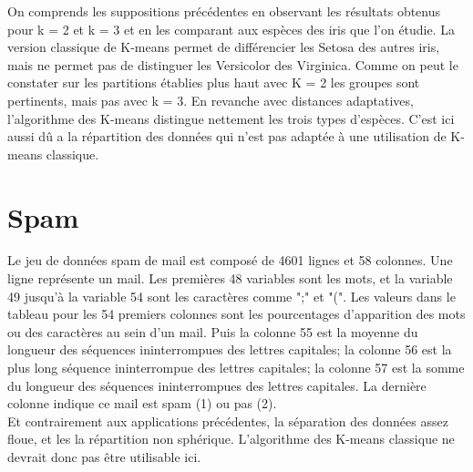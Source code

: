 \documentclass[a4paper, titlepage]{report}
\begin{document}
On comprends les suppositions précédentes en observant les résultats obtenus pour k = 2 et k = 3 et en les comparant aux espèces des iris que l'on étudie. La version classique de K-means permet de différencier les Setosa des autres iris, mais ne permet pas de distinguer les Versicolor des Virginica. Comme on peut le constater sur les partitions établies plus haut avec K = 2 les groupes sont pertinents, mais pas avec k = 3. En revanche avec distances adaptatives, l'algorithme des K-means distingue nettement les trois types d'espèces. C'est ici aussi dû a la répartition des données qui n'est pas adaptée à une utilisation de K-means classique.




\newpage
\section{Spam}
Le jeu de données spam de mail est composé de 4601 lignes et 58 colonnes. Une ligne représente un mail. Les premières 48 variables sont les mots, et la variable 49 jusqu'à la variable 54 sont les caractères comme ";" et "(". Les valeurs dans le tableau pour les 54 premiers colonnes sont les pourcentages d'apparition des mots ou des caractères au sein d'un mail. Puis la colonne 55 est la moyenne du longueur des séquences ininterrompues des lettres capitales; la colonne 56 est la plus long séquence ininterrompue des lettres capitales; la colonne 57 est la somme du longueur des séquences ininterrompues des lettres capitales. La dernière colonne indique ce mail est spam (1) ou pas (2).\\

Et contrairement aux applications précédentes, la séparation des données assez floue, et les la répartition non sphérique. L'algorithme des K-means classique ne devrait donc pas être utilisable ici.
\end{document}
